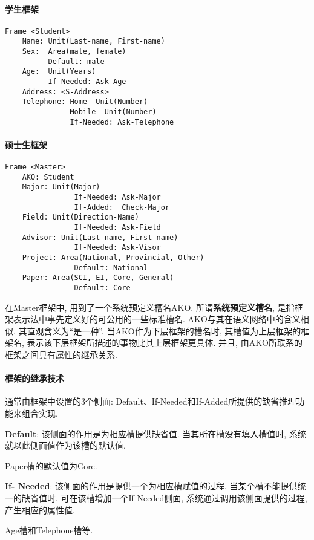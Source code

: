 \paragraph{学生框架}
\begin{Verbatim}
Frame <Student>
    Name: Unit(Last-name, First-name)
    Sex:  Area(male, female)
          Default: male
    Age:  Unit(Years)
          If-Needed: Ask-Age
    Address: <S-Address>
    Telephone: Home  Unit(Number)
               Mobile  Unit(Number)
               If-Needed: Ask-Telephone
\end{Verbatim}
\paragraph{硕士生框架}
\begin{Verbatim}
Frame <Master>
    AKO: Student
    Major: Unit(Major)
                If-Needed: Ask-Major
                If-Added:  Check-Major
    Field: Unit(Direction-Name)
                If-Needed: Ask-Field
    Advisor: Unit(Last-name, First-name)
                If-Needed: Ask-Visor
    Project: Area(National, Provincial, Other)
                Default: National
    Paper: Area(SCI, EI, Core, General)
                Default: Core
\end{Verbatim}
在Master框架中, 用到了一个系统预定义槽名AKO. 所谓\textbf{系统预定义槽名}, 是指框架表示法中事先定义好的可公用的一些标准槽名. AKO与其在语义网络中的含义相似, 其直观含义为“是一种”.
当AKO作为下层框架的槽名时, 其槽值为上层框架的框架名, 表示该下层框架所描述的事物比其上层框架更具体. 并且, 由AKO所联系的框架之间具有属性的继承关系.
\paragraph{框架的继承技术} 通常由框架中设置的3个侧面: Default、If-Needed和If-Added所提供的缺省推理功能来组合实现.

\textbf{Default}: 该侧面的作用是为相应槽提供缺省值. 当其所在槽没有填入槽值时, 系统就以此侧面值作为该槽的默认值.
\begin{example}
  Paper槽的默认值为Core.
\end{example}

\textbf{If- Needed}: 该侧面的作用是提供一个为相应槽赋值的过程. 当某个槽不能提供统一的缺省值时, 可在该槽增加一个If-Needed侧面, 系统通过调用该侧面提供的过程, 产生相应的属性值.
\begin{example}
  Age槽和Telephone槽等.
\end{example}

